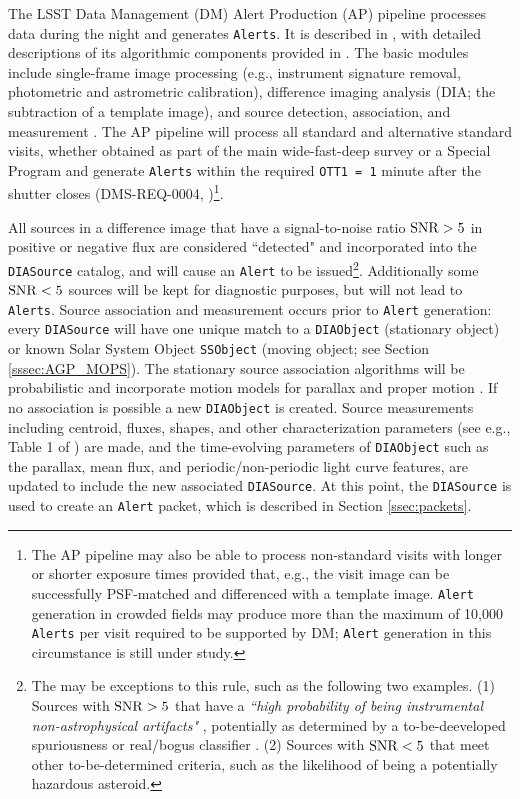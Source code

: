 The LSST Data Management (DM) Alert Production (AP) pipeline processes data during the night and generates {\tt Alerts}.
It is described in , with detailed descriptions of its algorithmic components provided in .
The basic modules include single-frame image processing (e.g., instrument signature removal, photometric and astrometric calibration), difference imaging analysis (DIA; the subtraction of a template image), and source detection, association, and measurement .
The AP pipeline will process all standard and alternative standard visits, whether obtained as part of the main wide-fast-deep survey or a Special Program  and generate {\tt Alerts} within the required {\tt OTT1 = 1} minute after the shutter closes (DMS-REQ-0004, )\footnote{
The AP pipeline may also be able to process non-standard visits with longer or shorter exposure times provided that, e.g., the visit image can be successfully PSF-matched and differenced with a template image.
\texttt{Alert} generation in crowded fields may produce more than the maximum of 10,000 \texttt{Alerts} per visit required to be supported by DM; \texttt{Alert} generation in this circumstance is still under study.
}.

All sources in a difference image that have a signal-to-noise ratio ${\rm SNR}>5$ in positive or negative flux are considered ``detected" and incorporated into the {\tt DIASource} catalog, and will cause an {\tt Alert} to be issued\footnote{
The may be exceptions to this rule, such as the following two examples.
(1) Sources with ${\rm SNR} > 5$ that have a {\it ``high probability of being instrumental non-astrophysical artifacts"} , potentially as determined by 
a to-be-deeveloped spuriousness or real/bogus classifier .
(2) Sources with ${\rm SNR} < 5$ that meet other to-be-determined criteria, such as the likelihood of being a potentially hazardous asteroid.
}.
Additionally some ${\rm SNR} < 5$ sources will be kept for diagnostic purposes, but will not lead to {\tt Alerts}.
Source association and measurement occurs prior to {\tt Alert} generation: every {\tt DIASource} will have one unique match to a {\tt DIAObject} (stationary object) or known Solar System Object {\tt SSObject} (moving object; see Section \ref{sssec:AGP_MOPS}).
The stationary source association algorithms will be probabilistic and incorporate motion models for parallax and proper motion .
If no association is possible a new {\tt DIAObject} is created.
Source measurements including centroid, fluxes, shapes, and other characterization parameters (see e.g., Table 1 of ) are made, and the time-evolving parameters of {\tt DIAObject} such as the parallax, mean flux, and periodic/non-periodic light curve features, are updated to include the new associated {\tt DIASource}.
At this point, the {\tt DIASource} is used to create an {\tt Alert} packet, which is described in Section \ref{ssec:packets}.

